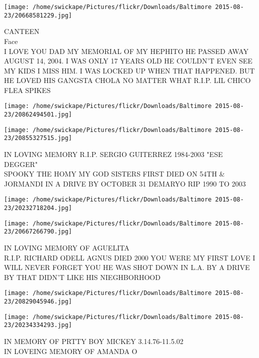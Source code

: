 \documentclass[10pt,letterpaper]{article}
\begin{document}
\vspace{0.25in}
\texttt{[image: /home/swickape/Pictures/flickr/Downloads/Baltimore 2015-08-23/20668581229.jpg]}

CANTEEN\\
Face\\
I LOVE YOU DAD MY MEMORIAL OF MY HEPHITO HE PASSED AWAY AUGUST 14, 2004.  I WAS ONLY 17 YEARS OLD HE COULDN'T EVEN SEE MY KIDS I MISS HIM.  I WAS LOCKED UP WHEN THAT HAPPENED.  BUT HE LOVED HIS GANGSTA CHOLA NO MATTER WHAT R.I.P. LIL CHICO FLEA SPIKES\\
\pagebreak

\texttt{[image: /home/swickape/Pictures/flickr/Downloads/Baltimore 2015-08-23/20862494501.jpg]}

\vspace{0.25in}
\texttt{[image: /home/swickape/Pictures/flickr/Downloads/Baltimore 2015-08-23/20855327515.jpg]}

IN LOVING MEMORY R.I.P. SERGIO GUITERREZ 1984{-}2003 "ESE DEGGER"\\
SPOOKY THE HOMY MY GOD SISTERS FIRST DIED ON 54TH \& JORMANDI IN A DRIVE BY OCTOBER 31 DEMARYO RIP 1990 TO 2003\\
\pagebreak

\texttt{[image: /home/swickape/Pictures/flickr/Downloads/Baltimore 2015-08-23/20232718204.jpg]}

\vspace{0.25in}
\texttt{[image: /home/swickape/Pictures/flickr/Downloads/Baltimore 2015-08-23/20667266790.jpg]}

IN LOVING MEMORY OF AGUELITA\\
R.I.P. RICHARD ODELL AGNUS DIED 2000 YOU WERE MY FIRST LOVE I WILL NEVER FORGET YOU HE WAS SHOT DOWN IN L.A. BY A DRIVE BY THAT DIDN'T LIKE HIS NIEGHBORHOOD\\
\pagebreak

\texttt{[image: /home/swickape/Pictures/flickr/Downloads/Baltimore 2015-08-23/20829045946.jpg]}

\vspace{0.25in}
\texttt{[image: /home/swickape/Pictures/flickr/Downloads/Baltimore 2015-08-23/20234334293.jpg]}

IN MEMORY OF PRTTY BOY MICKEY 3.14.76{-}11.5.02\\
IN LOVEING MEMORY OF AMANDA O\\
\pagebreak
\end{document}
